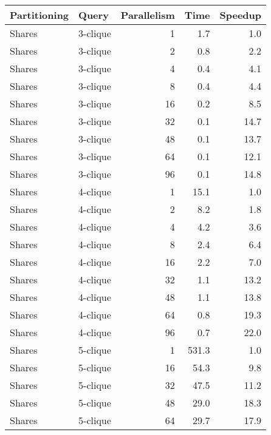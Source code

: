 \begin{tabular}{llr|rr}
\toprule
  Partitioning &     Query &  Parallelism &   Time &  Speedup \\
\midrule
        Shares &  3-clique &            1 &    1.7 &      1.0 \\
        Shares &  3-clique &            2 &    0.8 &      2.2 \\
        Shares &  3-clique &            4 &    0.4 &      4.1 \\
        Shares &  3-clique &            8 &    0.4 &      4.4 \\
        Shares &  3-clique &           16 &    0.2 &      8.5 \\
        Shares &  3-clique &           32 &    0.1 &     14.7 \\
        Shares &  3-clique &           48 &    0.1 &     13.7 \\
        Shares &  3-clique &           64 &    0.1 &     12.1 \\
        Shares &  3-clique &           96 &    0.1 &     14.8 \\
        Shares &  4-clique &            1 &   15.1 &      1.0 \\
        Shares &  4-clique &            2 &    8.2 &      1.8 \\
        Shares &  4-clique &            4 &    4.2 &      3.6 \\
        Shares &  4-clique &            8 &    2.4 &      6.4 \\
        Shares &  4-clique &           16 &    2.2 &      7.0 \\
        Shares &  4-clique &           32 &    1.1 &     13.2 \\
        Shares &  4-clique &           48 &    1.1 &     13.8 \\
        Shares &  4-clique &           64 &    0.8 &     19.3 \\
        Shares &  4-clique &           96 &    0.7 &     22.0 \\
        Shares &  5-clique &            1 &  531.3 &      1.0 \\
        Shares &  5-clique &           16 &   54.3 &      9.8 \\
        Shares &  5-clique &           32 &   47.5 &     11.2 \\
        Shares &  5-clique &           48 &   29.0 &     18.3 \\
        Shares &  5-clique &           64 &   29.7 &     17.9 \\

\end{tabular}
